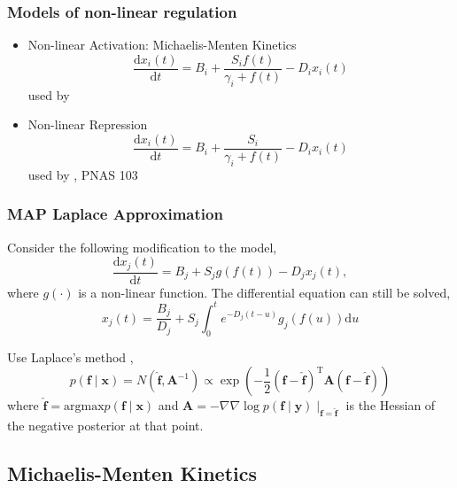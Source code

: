 
\begin{frame}
  \frametitle{Models of non-linear regulation}
  \begin{itemize}
  \item <1->Non-linear Activation: Michaelis-Menten Kinetics \[
    \frac{\text{d}x_{i}\left(t\right)}{\text{d}t}=B_{i}+\frac{S_{i}f\left(t\right)}{\gamma_{i}+f\left(t\right)}-D_{i}x_{i}\left(t\right)\]
    used by \citet{Rogers:model06a}
  \item <2->Non-linear Repression \[
    \frac{\text{d}x_{i}\left(t\right)}{\text{d}t}=B_{i}+\frac{S_{i}}{\gamma_{i}+f\left(t\right)}-D_{i}x_{i}\left(t\right)\]
    used by \citealp{Khanin:repression06}, PNAS 103 
  \end{itemize}



\end{frame}

\begin{frame}
  \frametitle{MAP Laplace Approximation}

  Consider the following modification to the model, \[
  \frac{\text{d}x_{j}\left(t\right)}{\text{d}t}=B_{j}+S_{j}g\left(f\left(t\right)\right)-D_{j}x_{j}\left(t\right),\]
  where $g\left(\cdot\right)$ is a non-linear function. The differential
  equation can still be solved, \[
  x_{j}\left(t\right)=\frac{B_{j}}{D_{j}}+S_{j}\int_{0}^{t}e^{-D_{j}\left(t-u\right)}g_{j}\left(f\left(u\right)\right)\text{d}u\]


  Use Laplace's method \citep{Laplace:memoire74}, 
  \[
  p\left(\mathbf{f}\mid\mathbf{x}\right)=N\left(\hat{\mathbf{f}},\mathbf{A}^{-1}\right)\propto\exp\left(-\frac{1}{2}\left(\mathbf{f}-\hat{\mathbf{f}}\right)^{\mbox{T}}\mathbf{A}\left(\mathbf{f}-\hat{\mathbf{f}}\right)\right)
  \]
  where $\hat{\mathbf{f}}=\textrm{argmax}p(\mathbf{f}\mid\mathbf{x})$
  and $\mathbf{A}=-\nabla\nabla\log p\left(\mathbf{f}\mid\mathbf{y}\right)\mid_{\mathbf{f}=\hat{\mathbf{f}}}$
  is the Hessian of the negative posterior at that point. 



\end{frame}

\subsection{Michaelis-Menten Kinetics}

